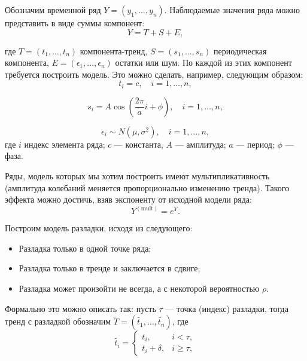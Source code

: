 \documentclass[%
12pt,
master,  %
natbib,      %
subf,        %
substylefile = spbu.rtx,
href,        %
colorlinks,  %
]{disser}
\begin{document}
Обозначим временной ряд $Y = (y_1, \dots, y_n)$. Наблюдаемые значения ряда можно представить в виде суммы компонент:
\begin{equation*}
Y = T + S + E ,
\end{equation*}


где  $ T = (t_1, \dots, t_n) $ компонента-тренд, $ S = (s_1, \dots, s_n) $ периодическая компонента, $ E = (\epsilon_1, \dots, \epsilon_n) $ остатки или шум.
По каждой из этих компонент требуется построить модель. Это можно сделать, например, следующим образом:
\begin{equation*}
t_i = c, \quad i = 1, \dots, n, 
\end{equation*}

\begin{equation*}
s_i = A \cos(\frac{2\pi}{a} i + \phi), \quad i = 1, \dots, n,
\end{equation*}

\begin{equation*}
\epsilon_i \sim N(\mu, \sigma^2), \quad i = 1, \dots, n, 
\end{equation*}
где $i$ индекс элемента ряда; $c$ --- константа, $A$ --- амплитуда; $a$ --- период; $\phi$ --- фаза.

Ряды, модель которых мы хотим построить имеют мультипликативность (амплитуда колебаний меняется пропорционально изменению тренда). Такого эффекта можно достичь, взяв экспоненту от исходной модели ряда:
\begin{equation*}
Y^{\mathrm{(mult)}} = e^{Y}. 
\end{equation*}

Построим модель разладки, исходя из следующего:
\begin{itemize}
	\item Разладка только в одной точке ряда;
	\item Разладка только в тренде и заключается в сдвиге;
	\item Разладка может произойти не всегда, а с некоторой вероятностью $\rho$.
\end{itemize}
Формально это можно описать так: пусть $\tau$ --- точка (индекс) разладки, тогда тренд с разладкой обозначим $ \tilde{T} = (\tilde{t_1}, \dots, \tilde{t_n}) $, где
\begin{equation*}
\tilde{t_i} =
	\begin{cases}
		t_i, & i < \tau, \\
		t_i + \delta, & i \geqslant \tau,
	\end{cases}
\end{equation*}
\end{document}
